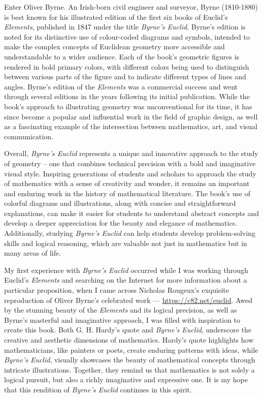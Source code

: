 \documentclass[twoside,11pt]{report}
\begin{document}
Enter Oliver Byrne.  An Irish-born civil engineer and surveyor, Byrne (1810-1880) is best known for his
illustrated edition of the first six books of Euclid’s \textit{Elements}, published in 1847 under the title
\textit{Byrne’s Euclid}. Byrne’s edition is noted for its distinctive use of colour-coded diagrams and symbols, intended to make the complex concepts of Euclidean geometry more accessible and understandable to a wider audience.  Each of the book’s geometric figures is rendered in bold primary colors, with different colors being used to distinguish between various parts of the figure and to indicate different types of lines and angles.  Byrne's edition of the \textit{Elements} was a commercial success and went through several editions in the years following its initial publication. While the book's approach to illustrating geometry was unconventional for its time, it has since become a popular and influential work in the field of graphic design, as well as a fascinating example of the intersection between mathematics, art, and visual communication.

Overall, \textit{Byrne's Euclid} represents a unique and innovative approach to the study of geometry -- one that combines technical precision with a bold and imaginative visual style. Inspiring generations of students and scholars to approach the study of mathematics with a sense of creativity and wonder, it
remains an important and enduring work in the history of mathematical literature.  The book's use of colorful diagrams and illustrations, along with concise and straightforward explanations, can make it easier for students to understand abstract concepts and develop a deeper appreciation for the beauty and elegance of mathematics. Additionally, studying \textit{Byrne's Euclid} can help students develop problem-solving skills and logical reasoning, which are valuable not just in mathematics but in many areas of life.

My first experience with \textit{Byrne’s Euclid} occurred while I was working through Euclid’s \textit{Elements} and searching on the Internet for more information about a particular proposition, when I came across Nicholas Rougeux's exquisite reproduction of Oliver Byrne's celebrated work --- \url{https://c82.net/euclid}.  Awed by the stunning beauty of the \textit{Elements} and its logical precision, as well as Byrne's masterful and imaginative approach, I was filled with inspiration to create this book.  Both G. H. Hardy's quote and \textit{Byrne's Euclid}, underscore the creative and aesthetic dimensions of mathematics. Hardy's quote highlights how mathematicians, like painters or poets, create enduring patterns with ideas, while \textit{Byrne's Euclid}, visually showcases the beauty of mathematical concepts through intricate illustrations. Together, they remind us that mathematics is not solely a logical pursuit, but also a richly imaginative and expressive one.  It is my hope that this rendition of \textit{Byrne's Euclid} continues in this spirit.
\end{document}
